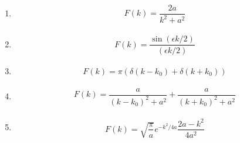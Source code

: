 \documentclass[11pt,a4]{jsarticle}
\numberwithin{equation}{section}
\begin{document}
\begin{enumerate}[(1)]
  \item 
    \begin{align*}
      F\left(k\right) = \dfrac{2a}{k^{2} + a^{2}} 
    \end{align*}
  \item
    \begin{align*}
      F\left(k\right) = \dfrac{\sin\left(\epsilon k / 2\right)}{\left(\epsilon k / 2\right)} 
    \end{align*}
  \item
    \begin{align*}
      F\left(k\right) = \pi \left(\delta\left(k-k_{0}\right)+\delta\left(k+k_{0}\right)\right)
    \end{align*}
  \item
    \begin{align*}
      F\left(k\right) = \dfrac{a}{\left(k-k_0\right)^{2}+a^{2}} + \dfrac{a}{\left(k+k_{0}\right)^{2} + a^{2}} 
    \end{align*}
  \item
    \begin{align*}
      F\left(k\right) = \sqrt{\dfrac{\pi}{a}}e^{-k^{2}/4a} \dfrac{2a - k^{2}}{4a^2} 
    \end{align*} 
\end{enumerate}
\end{document}
